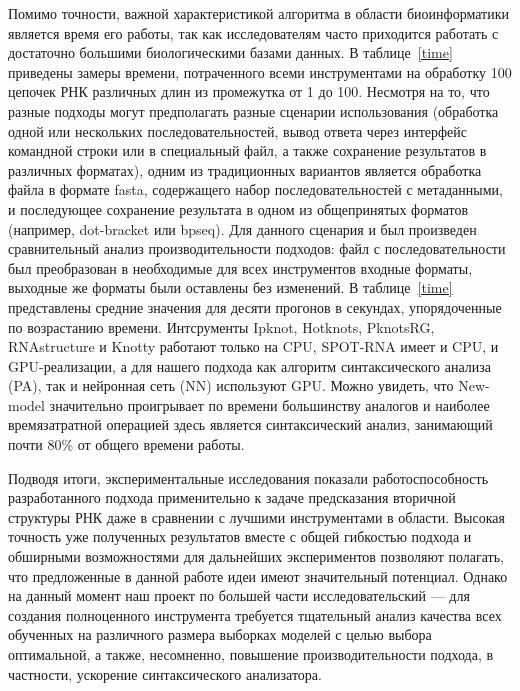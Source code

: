 Помимо точности, важной характеристикой алгоритма в области биоинформатики является время его работы, так как исследователям часто приходится работать с достаточно большими биологическими базами данных. В таблице~\ref{time} приведены замеры времени, потраченного всеми инструментами на обработку 100 цепочек РНК различных длин из промежутка от 1 до 100. Несмотря на то, что разные подходы могут предполагать разные сценарии использования (обработка одной или нескольких последовательностей, вывод ответа через интерфейс командной строки или в специальный файл, а также сохранение результатов в различных форматах), одним из традиционных вариантов является обработка файла в формате fasta, содержащего набор последовательностей с метаданными, и последующее сохранение результата в одном из общепринятых форматов (например, dot-bracket или bpseq). Для данного сценария и был произведен сравнительный анализ производительности подходов: файл с последовательности был преобразован в необходимые для всех инструментов входные форматы, выходные же форматы были оставлены без изменений. В таблице~\ref{time} представлены средние значения для десяти прогонов в секундах, упорядоченные по возрастанию времени. Интсрументы Ipknot, Hotknots, PknotsRG, RNAstructure и Knotty работают только на CPU, SPOT-RNA имеет и CPU, и GPU-реализации, а для нашего подхода как алгоритм синтаксического анализа (PA), так и нейронная сеть (NN) используют GPU. Можно увидеть, что New-model значительно проигрывает по времени большинству аналогов и наиболее времязатратной операцией здесь является синтаксический анализ, занимающий почти 80\% от общего времени работы.



Подводя итоги, экспериментальные исследования показали работоспособность разработанного подхода применительно к задаче предсказания вторичной структуры РНК даже в сравнении с лучшими инструментами в области. Высокая точность уже полученных результатов вместе с общей гибкостью подхода и обширными возможностями для дальнейших экспериментов позволяют полагать, что предложенные в данной работе идеи имеют значительный потенциал. Однако на данный момент наш проект по большей части исследовательский --- для создания полноценного инструмента требуется тщательный анализ качества всех обученных на различного размера выборках моделей с целью выбора оптимальной, а также, несомненно, повышение производительности подхода, в частности, ускорение синтаксического анализатора.